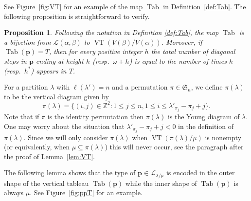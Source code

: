 \documentclass{amsart}
\numberwithin{equation}{section}
\newtheorem{prop}[thm]{Proposition}
\theoremstyle{definition}
\newcommand\VT{\operatorname{VT}}
\newcommand\Sym{\mathfrak{S}}
\newcommand\Tab{\operatorname{Tab}}
\newcommand\LL{\mathcal{L}_\lm}
\renewcommand\L{\mathcal{L}}
\newcommand\ZZ{\mathbb{Z}}
\newcommand\pp{\mathbf{p}}
\newcommand\lm{{\lambda/\mu}}
\begin{document}
See Figure~\ref{fig:VT} for an example of the map $\Tab$ in
Definition~\ref{def:Tab}. The following proposition is straightforward to
verify.


\begin{prop}\label{prop:Tab}
  Following the notation in Definition \ref{def:Tab}, the map $\Tab$ is a
  bijection from $\L(\alpha,\beta)$ to $\VT(V(\beta)/V(\alpha))$. Moreover,
  if $\Tab(\pp)=T$, then for every positive integer $h$ the total number of
  diagonal steps in $\pp$ ending at height $h$ (resp.~$\omega+h$) is equal to
  the number of times $h$ (resp.~$h^*$) appears in $T$.
\end{prop}

For a partition $\lambda$ with $\ell(\lambda')=n$ and a permutation
$\pi\in\Sym_n$, we define $\pi(\lambda)$ to be the vertical diagram given by 
\[
\pi(\lambda) = \{(i,j)\in\ZZ^2: 1\le j\le n, 1\le i\le \lambda'_{\pi_j}-\pi_j+j\}.
\]
Note that if $\pi$ is the identity permutation then $\pi(\lambda)$ is the Young
diagram of $\lambda$. One may worry about the situation that
$\lambda'_{\pi_j}-\pi_j+j<0$ in the definition of $\pi(\lambda)$. Since we will
only consider $\pi(\lambda)$ when $\VT(\pi(\lambda)/\mu)$ is nonempty (or
equivalently, when $\mu\subseteq\pi(\lambda)$) this will never occur, see the
paragraph after the proof of Lemma~\ref{lem:VT}.


The following lemma shows that the type of $\pp\in\LL$ is encoded in the outer
shape of the vertical tableau $\Tab(\pp)$ while the inner shape of $\Tab(\pp)$
is always $\mu$. See Figure~\ref{fig:ppT} for an example.
\end{document}
